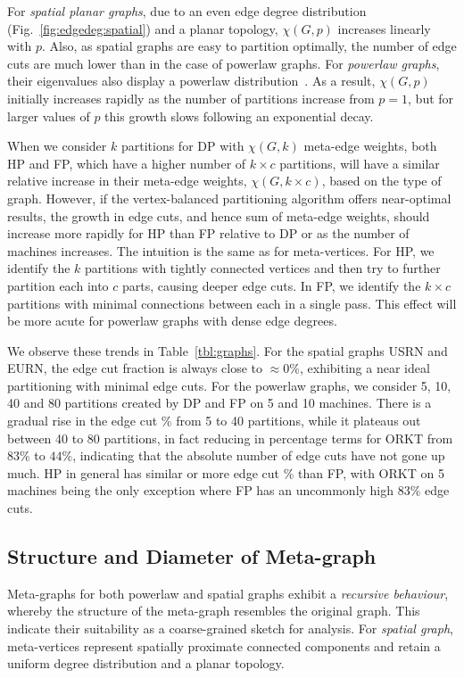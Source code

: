 \documentclass[10pt,conference, compsocconf]{IEEEtran}
\begin{document}
For \emph{spatial planar graphs}, due to an even edge degree distribution (Fig.~\ref{fig:edgedeg:spatial}) and a planar topology, $\chi(G,p)$ increases linearly with $p$. Also, as spatial graphs are easy to partition optimally, the number of edge cuts are much lower than in the case of powerlaw graphs. 
For \emph{powerlaw graphs}, their eigenvalues also display a powerlaw distribution~\cite{eigenpower}. As a result, $\chi(G,p)$ initially increases rapidly as the number of partitions increase from $p=1$, but for larger values of $p$ this growth slows following an exponential decay. 

When we consider $k$ partitions for DP with $\chi(G, k)$ meta-edge weights, both HP and FP, which have a higher number of $k \times c$ partitions, will have a similar relative increase in their meta-edge weights, $\chi(G, k \times c)$, based on the type of graph. However, if the vertex-balanced partitioning algorithm offers near-optimal results, the growth in edge cuts, and hence sum of meta-edge weights, should increase more rapidly for HP than FP relative to DP or as the number of machines increases. The intuition is the same as for meta-vertices. For HP, we identify the $k$ partitions with tightly connected vertices and then try to further partition each into $c$ parts, causing deeper edge cuts. In FP, we identify the $k \times c$ partitions with minimal connections between each in a single pass. This effect will be more acute for powerlaw graphs with dense edge degrees. 

We observe these trends in Table~\ref{tbl:graphs}. For the spatial graphs USRN and EURN, the edge cut fraction is always close to $\approx 0\%$, exhibiting a near ideal partitioning with minimal edge cuts. For the powerlaw graphs, we consider 5, 10, 40 and 80 partitions created by DP and FP on 5 and 10 machines. There is a gradual rise in the edge cut \% from 5 to 40 partitions, while it plateaus out between 40 to 80 partitions, in fact reducing in percentage terms for ORKT from $83\%$ to $44\%$, indicating that the absolute number of edge cuts have not gone up much. HP in general has similar or more edge cut \% than FP, with ORKT on 5 machines being the only exception where FP has an uncommonly high $83\%$ edge cuts.








\subsection{Structure and Diameter of Meta-graph}
Meta-graphs for both powerlaw and spatial graphs exhibit a \emph{recursive behaviour}, whereby the structure of the meta-graph resembles the original graph. This indicate their suitability as a coarse-grained sketch for analysis. For \emph{spatial graph}, meta-vertices represent spatially proximate connected components and retain a uniform degree distribution and a planar topology.
\end{document}
